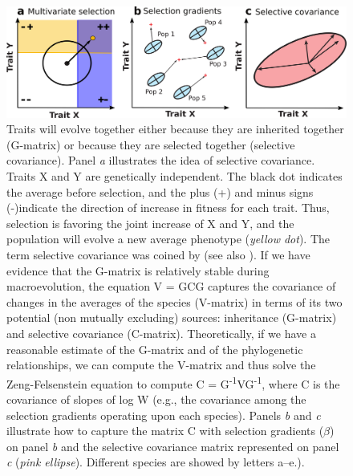 \begin{refsection}
\begin{figure}[ht]
\includegraphics[width=\linewidth]{chapter_annual_review/media/figure4.png}
\caption[Selective covariance]{Traits will evolve together
either because they are inherited together (G-matrix) or because they
are selected together (selective covariance). Panel \emph{a} illustrates
the idea of selective covariance. Traits X and Y are genetically
independent. The black dot indicates the average before selection, and
the plus (+) and minus signs (-)indicate the direction of increase in
fitness for each trait. Thus, selection is favoring the joint increase
of X and Y, and the population will evolve a new average phenotype
(\emph{yellow dot}). The term selective covariance was coined by
\textcite{Felsenstein1988-ql} (see also
\textcite{Zeng1988-or}). If we have evidence that
the G-matrix is relatively stable during macroevolution, the equation V
= GCG captures the covariance of changes in the averages of the species
(V-matrix) in terms of its two potential (non mutually excluding) sources:
inheritance (G-matrix) and selective covariance (C-matrix).
Theoretically, if we have a reasonable estimate of the G-matrix and of
the phylogenetic relationships, we can compute the V-matrix and thus
solve the Zeng-Felsenstein equation to compute C =
G\textsuperscript{-1}VG\textsuperscript{-1}, where C is the covariance
of slopes of log W (e.g., the covariance among the selection gradients
operating upon each species). Panels \emph{b} and \emph{c} illustrate
how to capture the matrix C with selection gradients ($\beta$) on panel
\emph{b} and the selective covariance matrix represented on panel
\emph{c} (\emph{pink ellipse}). Different species are showed by letters
a--e.).}
\label{aree:fig4}
\end{figure}


\end{refsection}
